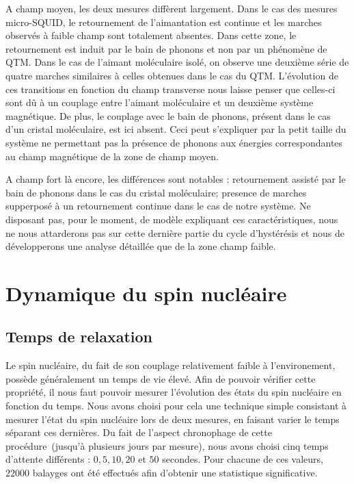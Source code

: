 A champ moyen, les deux mesures diffèrent largement. Dans le cas des mesures micro-SQUID, le retournement de l'aimantation est continue et les marches observés à faible champ sont totalement absentes. Dans cette zone, le retournement est induit par le bain de phonons et non par un phénomène de QTM. Dans le cas de l'aimant moléculaire isolé, on observe une deuxième série de quatre marches similaires à celles obtenues dans le cas du QTM. L'évolution de ces transitions en fonction du champ transverse nous laisse penser que celles-ci sont d\^u à un couplage entre l'aimant moléculaire et un deuxième système magnétique. De plus, le couplage avec le bain de phonons, présent dans le cas d'un cristal moléculaire, est ici absent. Ceci peut s'expliquer par la petit taille du système ne permettant pas la présence de phonons aux énergies correspondantes au champ magnétique de la zone de champ moyen.

A champ fort là encore, les différences sont notables : retournement assisté par le bain de phonons dans le cas du cristal moléculaire; presence  de marches supperposé à un retournement continue dans le cas de notre système. Ne disposant pas, pour le moment, de modèle expliquant ces caractéristiques, nous ne nous attarderons pas sur cette dernière partie du cycle d’hystérésis et nous de développerons une analyse détaillée que de la zone champ faible.


\section{Dynamique du spin nucléaire}


\subsection{Temps de relaxation}
Le spin nucléaire, du fait de son couplage relativement faible à l'environement, possède généralement un temps de vie élevé. Afin de pouvoir vérifier cette propriété, il nous faut pouvoir mesurer l'évolution des états du spin nucléaire en fonction du temps. Nous avons choisi pour cela une technique simple consistant à mesurer l'état du spin nucléaire lors de deux mesures, en faisant varier le temps séparant ces dernières. Du fait de l'aspect chronophage de cette procédure~(jusqu'à plusieurs jours par mesure), nous avons choisi cinq temps d'attente différents : $0,5,10,20$ et $50$ secondes. Pour chacune de ces valeurs, $22000$ balayges ont été effectués afin d'obtenir une statistique significative.


